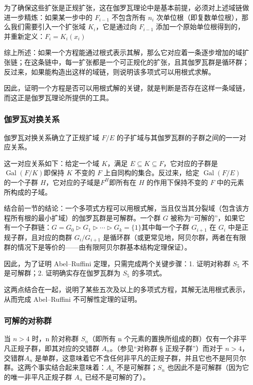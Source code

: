 为了确保这些扩张是正规扩张，这在伽罗瓦理论中是基本前提，必须对上述域链做进一步精炼：如果某一步中的 $F_{i-1}$ 不包含所有 $n_i$ 次单位根（即复数单位根），那么我们需要引入一个扩张域 $K_i$，它是通过向 $F_{i-1}$ 添加一个原始单位根得到的，并重新定义：$F_i = K_i(x_i)$

综上所述：如果一个方程能通过根式表示其解，那么它对应着一条逐步增加的域扩张链；在这条链中，每一扩张都是一个可正规化的扩张，且其伽罗瓦群是循环群；反过来，如果能构造出这样的域链，则说明该多项式可以用根式求解。

因此，证明一个方程是否可以用根式解的关键，就是判断是否存在这样一条域链，而这正是伽罗瓦理论所提供的工具。
\subsubsection{伽罗瓦对换关系}
伽罗瓦对换关系确立了正规扩域 $F/E$ 的子扩域与其伽罗瓦群的子群之间的一一对应关系。

这一对应关系如下：给定一个域 $K$，满足 $E \subseteq K \subseteq F$，它对应的子群是$\operatorname{Gal}(F/K)$即保持 $K$ 不变的 $F$ 上自同构的集合。反过来，给定 $\operatorname{Gal}(F/E)$ 的一个子群 $H$，它对应的子域是$F^H$即所有在 $H$ 的作用下保持不变的 $F$ 中的元素所构成的子域。

结合前一节的结论：一个多项式方程可以用根式解，当且仅当其分裂域（包含该方程所有根的最小扩域）的伽罗瓦群是可解群。一个群 $G$ 被称为“可解的”，如果它有一个子群链：$G = G_0 \triangleright G_1 \triangleright \cdots \triangleright G_k = \{1\}$其中每一个子群 $G_{i+1}$ 在 $G_i$ 中是正规子群，且对应的商群 $G_i / G_{i+1}$ 是循环群（或更常见地，阿贝尔群，两者在有限群的情况下是等价的——由有限阿贝尔群基本结构定理保证）。

因此，为了证明 Abel–Ruffini 定理，只需完成两个关键步骤：1. 证明对称群 $S_5$ 不是可解群；2. 证明确实存在伽罗瓦群为 $S_5$ 的多项式。

这两点结合在一起，说明了某些五次及以上的多项式方程，其解无法用根式表示，从而完成 Abel–Ruffini 不可解性定理的证明。

\subsubsection{可解的对称群}
当 $n > 4$ 时，n 阶对称群 $S_n$（即所有 n 个元素的置换所组成的群）仅有一个非平凡正规子群，即其对应的交错群 $A_n$。（参见“对称群 § 正规子群”）而对于 $n > 4$，交错群$A_n$ 是单群，这意味着它不含任何非平凡的正规子群，并且它也不是阿贝尔群。这两个事实结合起来意味着：$A_n$ 不是可解群；$S_n$ 也因此不是可解群（因为它的唯一非平凡正规子群 $A_n$ 已经不是可解的了）。

